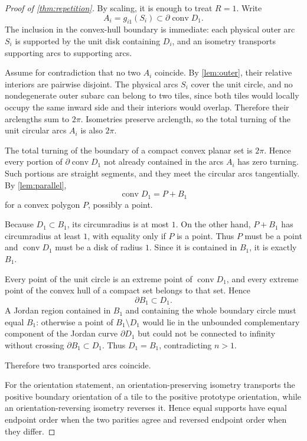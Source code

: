 \documentclass[11pt]{article}
\newcommand{\conv}{\operatorname{conv}}
\begin{document}
\begin{proof}[Proof of \cref{thm:repetition}]
By scaling, it is enough to treat $R=1$. Write
\[
  A_i=g_{i1}(S_i)\subset\partial\conv D_1.
\]
The inclusion in the convex-hull boundary is immediate: each physical outer arc $S_i$ is supported by the unit disk containing $D_i$, and an isometry transports supporting arcs to supporting arcs.

Assume for contradiction that no two $A_i$ coincide. By \cref{lem:outer}, their relative interiors are pairwise disjoint. The physical arcs $S_i$ cover the unit circle, and no nondegenerate outer subarc can belong to two tiles, since both tiles would locally occupy the same inward side and their interiors would overlap. Therefore their arclengths sum to $2\pi$. Isometries preserve arclength, so the total turning of the unit circular arcs $A_i$ is also $2\pi$.

The total turning of the boundary of a compact convex planar set is $2\pi$. Hence every portion of $\partial\conv D_1$ not already contained in the arcs $A_i$ has zero turning. Such portions are straight segments, and they meet the circular arcs tangentially. By \cref{lem:parallel},
\[
  \conv D_1=P+B_1
\]
for a convex polygon $P$, possibly a point.

Because $D_1\subset B_1$, its circumradius is at most $1$. On the other hand, $P+B_1$ has circumradius at least $1$, with equality only if $P$ is a point. Thus $P$ must be a point and $\conv D_1$ must be a disk of radius $1$. Since it is contained in $B_1$, it is exactly $B_1$.

Every point of the unit circle is an extreme point of $\conv D_1$, and every extreme point of the convex hull of a compact set belongs to that set. Hence
\[
  \partial B_1\subset D_1.
\]
A Jordan region contained in $B_1$ and containing the whole boundary circle must equal $B_1$: otherwise a point of $B_1\setminus D_1$ would lie in the unbounded complementary component of the Jordan curve $\partial D_1$ but could not be connected to infinity without crossing $\partial B_1\subset D_1$. Thus $D_1=B_1$, contradicting $n>1$.

Therefore two transported arcs coincide.

For the orientation statement, an orientation-preserving isometry transports the positive boundary orientation of a tile to the positive prototype orientation, while an orientation-reversing isometry reverses it. Hence equal supports have equal endpoint order when the two parities agree and reversed endpoint order when they differ.
\end{proof}
\end{document}

